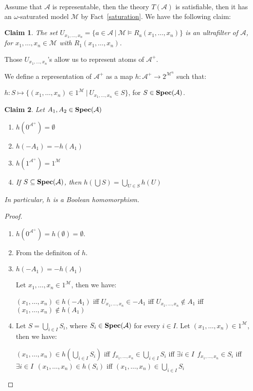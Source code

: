 \documentclass{article}
\theoremstyle{defin}
\theoremstyle{theorem}
\theoremstyle{claim}
\newtheorem{claim}{Claim}
\theoremstyle{prop}
\theoremstyle{lemma}
\theoremstyle{fact}
\theoremstyle{remark}
\theoremstyle{ex}
\theoremstyle{col}
\theoremstyle{question}
\begin{document}
Assume that $\mathcal{A}$ is representable, then the theory $T(\mathcal{A})$ is satisfiable,
then it has an $\omega$-saturated model $\mathcal{M}$ by Fact~\ref{saturation}. We have the following claim:
\begin{claim}
The set $U_{x_1,\dots,x_n} = \{ a \in \mathcal{A} \: | \: \mathcal{M} \models R_a(x_1,\dots,x_n)\}$
is an ultrafilter of $\mathcal{A}$, for $x_1,\dots,x_n \in \mathcal{M}$ with $R_{1}(x_1,\dots,x_n)$.
\end{claim}
Those $U_{x_1,\dots,x_n}$'s allow us to represent atoms of $\mathcal{A}^{+}$.

We define a representation of $\mathcal{A}^{+}$ as a map $h : \mathcal{A}^{+} \to 2^{\mathcal{M}^n}$ such that:
\begin{center}
$h : S \mapsto \{ (x_1, \dots, x_n) \in 1^{\mathcal{M}} \: | \: U_{x_1,\dots,x_n} \in S \}$, for $S \in {\bf Spec}(\mathcal{A})$.
\end{center}

\begin{claim} Let $A_1, A_2 \in {\bf Spec}(\mathcal{A})$
\begin{enumerate}
\item $h(0^{\mathcal{A}^{+}}) = \emptyset$
\item $h(- A_1) = - h(A_1)$
\item $h(1^{\mathcal{A}^{+}}) = 1^{\mathcal{M}}$
\item If $S \subseteq {\bf Spec}(\mathcal{A})$, then $h(\bigcup S) = \bigcup \limits_{U \in S} h(U)$
\end{enumerate}
In particular, $h$ is a Boolean homomorphism.
\end{claim}

\begin{proof}
$ $

\begin{enumerate}
\item $h(0^{\mathcal{A}^{+}}) = h(\emptyset) = \emptyset$.
\item From the definiton of $h$.
\item $h(- A_1) = - h(A_1)$

Let $x_1, \dots, x_n \in 1^{\mathcal{M}}$, then we have:

\begin{center}
$(x_1, \dots, x_n) \in h(- A_1)$ iff $U_{x_1, \dots, x_n} \in - A_1$ iff $U_{x_1, \dots, x_n} \notin A_1$ iff $(x_1, \dots, x_n) \notin h(A_1)$
\end{center}
\item Let $S = \bigcup \limits_{i \in I} S_i$, where $S_i \in {\bf Spec}(\mathcal{A})$ for every $i \in I$.
Let $(x_1, \dots, x_n) \in 1^{\mathcal{M}}$, then we have:
\begin{center}
$(x_1, \dots, x_n) \in h(\bigcup \limits_{i \in I} S_i)$ iff $f_{x_1, \dots, x_n} \in \bigcup \limits_{i \in I} S_i$ 
iff $\exists i \in I \:\: f_{x_1, \dots, x_n} \in S_i$ iff $\exists i \in I \:\: (x_1, \dots, x_n) \in h(S_i)$ 
iff $(x_1, \dots, x_n) \in \bigcup \limits_{i \in I} S_i$
\end{center}
\end{enumerate}
\end{proof}
\end{document}
